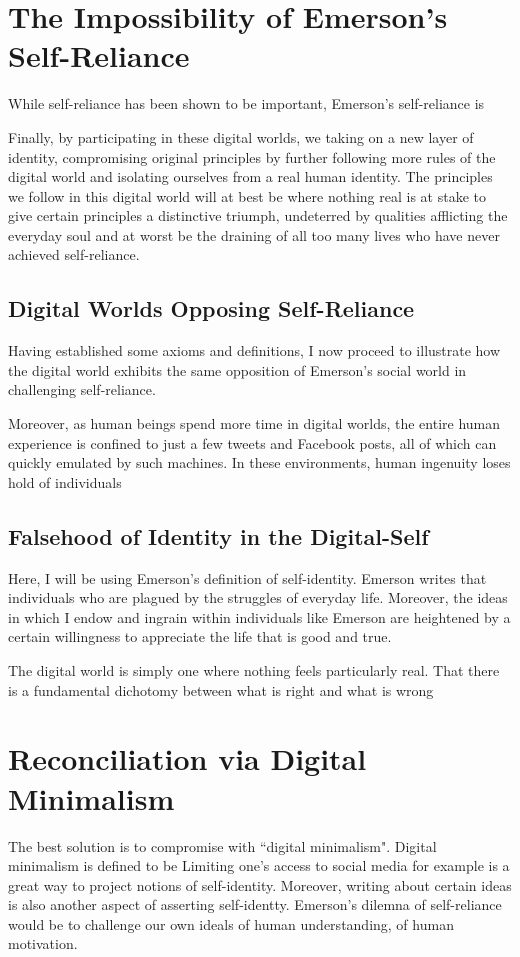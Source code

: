 \documentclass[12pt,letterpaper]{article}
\begin{document}
\section{The Impossibility of Emerson's Self-Reliance}

While self-reliance has been shown to be important, Emerson's self-reliance is 

Finally, by participating in these digital worlds, we taking on a new layer of identity, compromising original principles by further following more rules of the digital world and isolating ourselves from a real human identity.  The principles we follow in this digital world will at best be where nothing real is at stake to give certain principles a distinctive triumph, undeterred by qualities afflicting the everyday soul and at worst be the draining of all too many lives who have never achieved self-reliance.

\subsection{Digital Worlds Opposing Self-Reliance}
Having established some axioms and definitions, I now proceed to illustrate how the digital world exhibits the same opposition of Emerson's social world in challenging self-reliance. 

Moreover, as human beings spend more time in digital worlds, the entire human experience is confined to just a few tweets and Facebook posts, all of which can quickly emulated by such machines.  In these environments, human ingenuity loses hold of individuals

\subsection{Falsehood of Identity in the Digital-Self}
Here, I will be using Emerson's definition of self-identity.  Emerson writes that individuals who are plagued by the struggles of everyday life.  Moreover, the ideas in which I endow and ingrain within individuals like Emerson are heightened by a certain willingness to appreciate the life that is good and true.

The digital world is simply one where nothing feels particularly real.  That there is a fundamental dichotomy between what is right and what is wrong

\section{Reconciliation via Digital Minimalism}
The best solution is to compromise with ``digital minimalism".  Digital minimalism is defined to be Limiting one's access to social media for example is a great way to project notions of self-identity.  Moreover, writing about certain ideas is also another aspect of asserting self-identty.  
 Emerson's dilemna of self-reliance would be to challenge our own ideals of human understanding, of human motivation.
\end{document}
